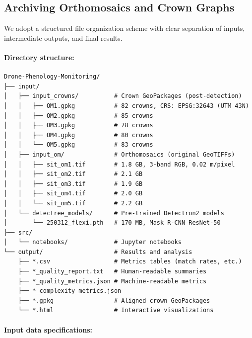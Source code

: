 \subsection{Archiving Orthomosaics and Crown Graphs}

We adopt a structured file organization scheme with clear separation of inputs, intermediate outputs, and final results.

\paragraph{Directory structure:}
\begin{verbatim}
Drone-Phenology-Monitoring/
├── input/
│   ├── input_crowns/          # Crown GeoPackages (post-detection)
│   │   ├── OM1.gpkg           # 82 crowns, CRS: EPSG:32643 (UTM 43N)
│   │   ├── OM2.gpkg           # 85 crowns
│   │   ├── OM3.gpkg           # 78 crowns
│   │   ├── OM4.gpkg           # 80 crowns
│   │   └── OM5.gpkg           # 83 crowns
│   ├── input_om/              # Orthomosaics (original GeoTIFFs)
│   │   ├── sit_om1.tif        # 1.8 GB, 3-band RGB, 0.02 m/pixel
│   │   ├── sit_om2.tif        # 2.1 GB
│   │   ├── sit_om3.tif        # 1.9 GB
│   │   ├── sit_om4.tif        # 2.0 GB
│   │   └── sit_om5.tif        # 2.2 GB
│   └── detectree_models/      # Pre-trained Detectron2 models
│       └── 250312_flexi.pth   # 170 MB, Mask R-CNN ResNet-50
├── src/
│   └── notebooks/             # Jupyter notebooks
└── output/                    # Results and analysis
    ├── *.csv                  # Metrics tables (match rates, etc.)
    ├── *_quality_report.txt   # Human-readable summaries
    ├── *_quality_metrics.json # Machine-readable metrics
    ├── *_complexity_metrics.json
    ├── *.gpkg                 # Aligned crown GeoPackages
    └── *.html                 # Interactive visualizations
\end{verbatim}

\paragraph{Input data specifications:}

